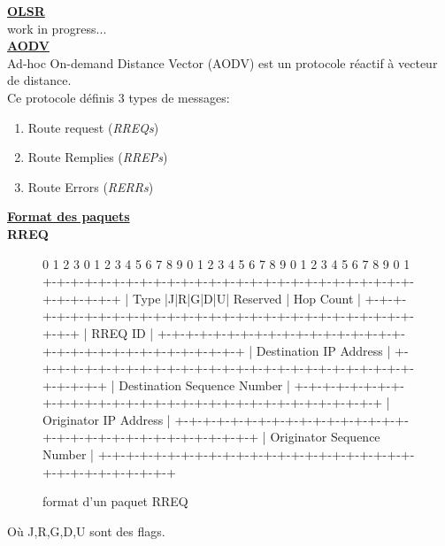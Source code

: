 \documentclass[a4paper, 12pt]{report}
\begin{document}
    \vspace{2cm}
    \underline{\textbf{OLSR}}\\
        work in progress...\\
    \underline{\textbf{AODV}}\\
        Ad-hoc On-demand Distance Vector (AODV) est un protocole réactif à vecteur de distance.\\
        Ce protocole définis 3 types de messages:
        \begin{enumerate}
            \item Route request (\textit{RREQs})
            \item Route Remplies (\textit{RREPs})
            \item Route Errors (\textit{RERRs})
        \end{enumerate}

        
        \underline{\textbf{Format des paquets}}\\
        
        
        \textbf{RREQ}
        \begin{figure}[H]
        \centering
            \begin{verbatimtab}
 0                   1                   2                   3
 0 1 2 3 4 5 6 7 8 9 0 1 2 3 4 5 6 7 8 9 0 1 2 3 4 5 6 7 8 9 0 1
+-+-+-+-+-+-+-+-+-+-+-+-+-+-+-+-+-+-+-+-+-+-+-+-+-+-+-+-+-+-+-+-+
|     Type      |J|R|G|D|U|   Reserved          |   Hop Count   |
+-+-+-+-+-+-+-+-+-+-+-+-+-+-+-+-+-+-+-+-+-+-+-+-+-+-+-+-+-+-+-+-+
|                            RREQ ID                            |
+-+-+-+-+-+-+-+-+-+-+-+-+-+-+-+-+-+-+-+-+-+-+-+-+-+-+-+-+-+-+-+-+
|                    Destination IP Address                     |
+-+-+-+-+-+-+-+-+-+-+-+-+-+-+-+-+-+-+-+-+-+-+-+-+-+-+-+-+-+-+-+-+
|                  Destination Sequence Number                  |
+-+-+-+-+-+-+-+-+-+-+-+-+-+-+-+-+-+-+-+-+-+-+-+-+-+-+-+-+-+-+-+-+
|                    Originator IP Address                      |
+-+-+-+-+-+-+-+-+-+-+-+-+-+-+-+-+-+-+-+-+-+-+-+-+-+-+-+-+-+-+-+-+
|                  Originator Sequence Number                   |
+-+-+-+-+-+-+-+-+-+-+-+-+-+-+-+-+-+-+-+-+-+-+-+-+-+-+-+-+-+-+-+-+
            \end{verbatimtab}
        \caption{format d'un paquet RREQ \cite{aodv_w}}
        \label{rreqPaquet}
    \end{figure}

    Où J,R,G,D,U sont des flags.\\
        
\end{document}
